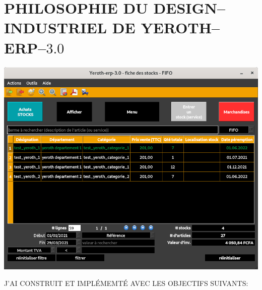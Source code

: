 \chapter{PHILOSOPHIE DU DESIGN--INDUSTRIEL DE YEROTH--ERP--$3.0$}


\begin{center}
\includegraphics[scale=0.52]{images/yeroth-erp-3-0-stocks-fenetre-screenshot.png}
\label{fig:fenetre-de-visualisation-de-stocks-DESIGN_YEROTH_ERP_3_0}
\end{center}


J'AI CONSTRUIT ET IMPLÉMEMTÉ \yerotherpblack AVEC LES OBJECTIFS
SUIVANTS:

